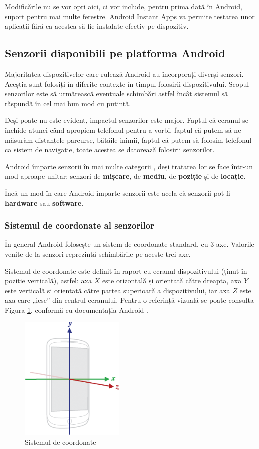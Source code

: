 \documentclass[12pt,a4paper]{article}
\begin{document}
	Modificările nu se vor opri aici, ci vor include, pentru prima dată în Android, suport pentru mai multe ferestre. Android Instant Apps va permite testarea unor aplicații fără ca acestea să fie instalate efectiv pe dispozitiv.
	

\subsection{Senzorii disponibili pe platforma Android}
Majoritatea dispozitivelor care rulează Android au încorporați diverși senzori. Aceștia sunt folosiți în diferite contexte în timpul folosirii dispozitivului. Scopul senzorilor este să urmărească eventuale schimbări astfel încât sistemul să răspundă în cel mai bun mod cu putință.

	Deși poate nu este evident, impactul senzorilor este major. Faptul că ecranul se închide atunci când apropiem telefonul pentru a vorbi, faptul că putem să ne măsurăm distanțele parcurse, bătăile inimii, faptul că putem să folosim telefonul ca sistem de navigație, toate acestea se datorează folosirii senzorilor.
	
	Android împarte senzorii în mai multe categorii \cite{DeveloperAndroid}, deși tratarea lor se face într-un mod aproape unitar: senzori de \textbf{mișcare}, de \textbf{mediu}, de \textbf{poziție} și de \textbf{locație}.

	Încă un mod în care Android împarte senzorii este acela că senzorii pot fi \textbf{hardware} sau \textbf{software}.\\
	
\subsubsection{Sistemul de coordonate al senzorilor}
În general Android folosește un sistem de coordonate standard, cu 3 axe. Valorile venite de la senzori reprezintă schimbările pe aceste trei axe.

Sistemul de coordonate este definit în raport cu ecranul dispozitivului (ținut în pozitie verticală), astfel: axa $X$ este orizontală și orientată către dreapta, axa $Y$ este verticală si orientată către partea superioară a dispozitivului, iar axa $Z$ este axa care „iese” din centrul ecranului. Pentru o referință vizuală se poate consulta Figura \ref{fig:axis_device}, conformă cu documentația Android \cite{DeveloperAndroid}.

\begin{figure}[hbtp]
\centering
\includegraphics[width=5cm]{figures/axis_device.png}
\caption{Sistemul de coordonate}
\label{fig:axis_device}
\end{figure}
\end{document}
